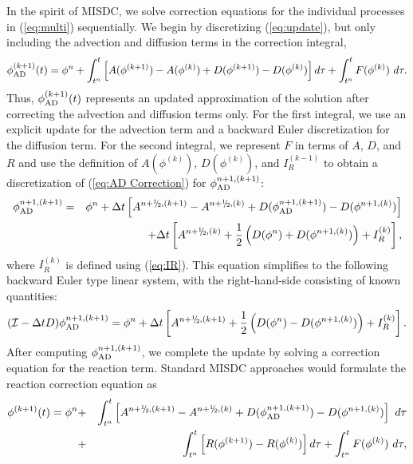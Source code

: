 In the spirit of MISDC, we solve correction equations for the individual processes in 
(\ref{eq:multi}) sequentially.  We begin by discretizing (\ref{eq:update}), but only
including the advection and diffusion terms in the correction integral,
\begin{equation}
\phi_{\rm AD}^{(k+1)}(t) = \phi^n + \int_{t^n}^t \left[A(\phi^{(k+1)}) - A(\phi^{(k)}) + D(\phi^{(k+1)}) - D(\phi^{(k)})\right]d\tau + \int_{t^n}^t F(\phi^{(k)})~d\tau.\label{eq:AD Correction}
\end{equation}
Thus, $\phi_{\rm AD}^{(k+1)}(t)$ represents an updated approximation of the solution after correcting the
advection and diffusion terms only.  For the first integral, we use an explicit update for the advection term and a 
backward Euler discretization for the diffusion term.
For the second integral, we represent $F$ in terms of $A$, $D$, and $R$ and
use the definition
of $A(\phi^{(k)})$, $D(\phi^{(k)})$, and $I_R^{(k-1)}$ to obtain
a discretization of (\ref{eq:AD Correction}) for 
$\phi_{\rm AD}^{n+1,(k+1)}$:
\begin{eqnarray}
\phi_{\rm AD}^{n+1,(k+1)} &=& \phi^n + \Delta t  \left[A^{n+\myhalf,(k+1)} - A^{n+\myhalf,(k)} + D(\phi_{\rm AD}^{n+1,(k+1)}) - D(\phi^{n+1,(k)})\right] \nonumber \\
&&\hspace{0.5cm}+ \Delta t\left[A^{n+\myhalf,(k)} + \half\left(D(\phi^n) + D(\phi^{n+1,(k)})\right) + I_R^{(k)}\right],
\end{eqnarray}
where $I_R^{(k)}$ is defined using (\ref{eq:IR}).
This equation simplifies to the following backward Euler type linear system, with the
right-hand-side consisting of known quantities:
\begin{equation}
(\mathcal{I} - \Delta t D)\phi_{\rm AD}^{n+1,(k+1)} = \phi^n + \Delta t \left[A^{n+\myhalf,(k+1)} + \half\left(D(\phi^n) - D(\phi^{n+1,(k)})\right) + I_R^{(k)}\right].
\end{equation}
After computing $\phi_{\rm AD}^{n+1,(k+1)}$, we complete the update by solving a correction equation for
the reaction term.  Standard MISDC approaches would formulate the reaction correction equation as
\begin{eqnarray}
{\phi}^{(k+1)}(t) = \phi^n &+& \int_{t^n}^t \left[ A^{n+\myhalf,(k+1)} - A^{n+\myhalf,(k)} + D(\phi_{\rm AD}^{n+1,(k+1)}) - D(\phi^{n+1,(k)}) \right]~d\tau \nonumber \\
&+& \int_{t^n}^t \left[R(\phi^{(k+1)}) - R(\phi^{(k)})\right]d\tau + \int_{t^n}^t F(\phi^{(k)})~d\tau, \label{eq:stdreact}
\end{eqnarray}
